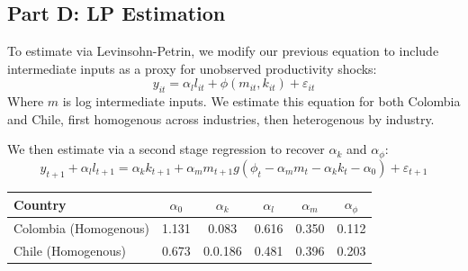 \documentclass{article}
\begin{document}
\subsection*{Part D: LP Estimation}

To estimate via Levinsohn-Petrin, we modify our previous equation to include intermediate inputs as a proxy for unobserved productivity shocks:
\begin{equation}
  y_{it} = \alpha_l l_{it} + \phi(m_{it}, k_{it}) + \varepsilon_{it}
\end{equation}
Where $m$ is log intermediate inputs. We estimate this equation for both Colombia and Chile, first homogenous across industries, then heterogenous by industry.

We then estimate via a second stage regression to recover $\alpha_k$ and $\alpha_{\phi}$:
\begin{equation}
  y_{t+1} + \alpha_l l_{t+1} = \alpha_k k_{t+1} + \alpha_m m_{t+1} g(\phi_t - \alpha_m m_t - \alpha_k k_t - \alpha_0) + \varepsilon_{t+1}
\end{equation}

\begin{center}
\begin{tabular}[h]{|lccccc|}
  \hline
  \textbf{Country} & \textbf{$\alpha_0$} & \textbf{$\alpha_k$} & \textbf{$\alpha_l$} & \textbf{$\alpha_m$} & \textbf{$\alpha_{\phi}$} \\
  \hline
  Colombia (Homogenous) & 1.131 & 0.083 & 0.616 & 0.350 & 0.112 \\
  Chile (Homogenous) & 0.673 & 0.0.186 & 0.481 & 0.396 & 0.203 \\
  \hline
\end{tabular}
\end{center}
\end{document}
